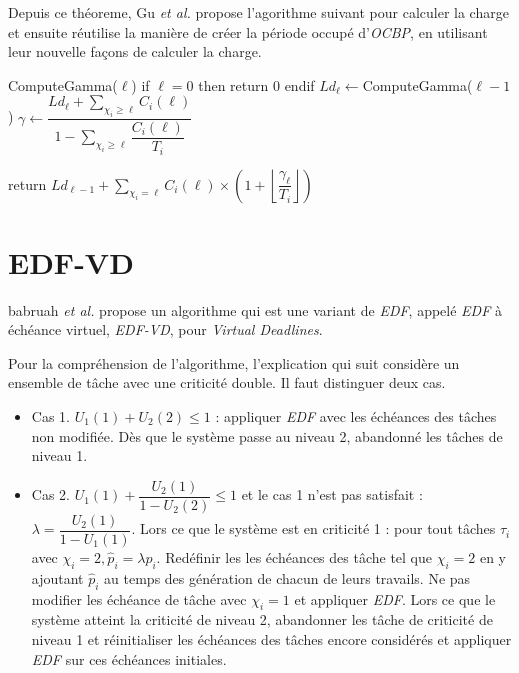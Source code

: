 \documentclass[12pt,a4paper,oneside]{book}
\theoremstyle{break}
\theoremstyle{breakplain}
\begin{document}
Depuis ce théoreme, Gu \textit{et al.} propose l'agorithme suivant pour calculer la charge et ensuite réutilise la manière de créer la période occupé d'\textit{OCBP}, en utilisant leur nouvelle façons de calculer la charge.


\begin{algorithm}[caption={Calcul la charge $\ell$-critique}, label={alg1},mathescape=true]
ComputeGamma($\ell$)
 if $\ell = 0$ then
  return 0
 endif
 $\displaystyle Ld_\ell \gets $ComputeGamma($\ell-1$)
 $\displaystyle \gamma \gets \dfrac{Ld_\ell + \sum_{\chi_i \geq \ell} C_i(\ell)}{1-\sum_{\chi_i \geq \ell} \dfrac{C_i(\ell)}{T_i}}$
 
 return $\displaystyle Ld_{\ell-1} + \sum_{\chi_i = \ell}C_i(\ell) \times \left( 1 + \left\lfloor \dfrac{\gamma_\ell}{T_i} \right\rfloor \right)$
       
\end{algorithm}

\section{EDF-VD}
babruah \textit{et al.} propose un algorithme\cite{BaruahBDMSS11} qui est une variant de \textit{EDF}, appelé \textit{EDF} à échéance virtuel, \textit{EDF-VD}, pour \textit{Virtual Deadlines}.

Pour la compréhension de l'algorithme, l'explication qui suit considère un ensemble de tâche avec une criticité double. Il faut distinguer deux cas.

\begin{itemize}
\item Cas 1. $U_1(1) + U_2(2) \le 1$ : appliquer \textit{EDF} avec les échéances des tâches non modifiée. Dès que le système passe au niveau 2, abandonné les tâches de niveau 1.

\item Cas 2. $U_1(1) + \dfrac{U_2(1)}{1-U_2(2)} \le 1$ et le cas 1 n'est pas satisfait : $\lambda = \dfrac{U_2(1)}{1-U_1(1)}$. Lors ce que le système est en criticité 1 : pour tout tâches $\tau_i$ avec $\chi_i = 2, \widehat{p}_i = \lambda p_i$. Redéfinir les les échéances des tâche tel que $\chi_i = 2$ en y ajoutant $\widehat{p}_i$ au temps des génération de chacun de leurs travails. Ne pas modifier les échéance de tâche avec $\chi _i =1$ et appliquer \textit{EDF}. Lors ce que le système atteint la criticité de niveau 2, abandonner les tâche de criticité de niveau 1 et réinitialiser les échéances des tâches encore considérés et appliquer \textit{EDF} sur ces échéances initiales.
\end{itemize}
\end{document}

